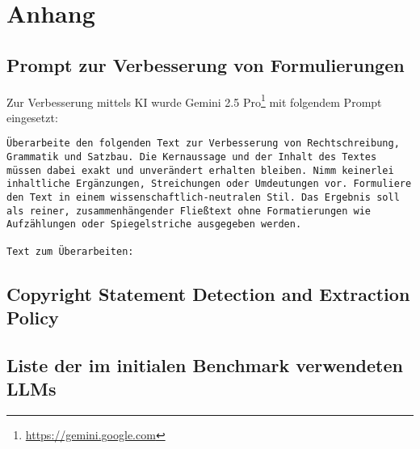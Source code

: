 \chapter{Anhang}\label{ch:anhang}

\section{Prompt zur Verbesserung von Formulierungen}\label{sec:prompt-zur-verbesserung-von-formulierungen}

Zur Verbesserung mittels KI wurde Gemini 2.5 Pro\footnote{\url{https://gemini.google.com}} mit folgendem Prompt eingesetzt:

\begin{lstlisting}[keepspaces=true]
Überarbeite den folgenden Text zur Verbesserung von Rechtschreibung, Grammatik und Satzbau. Die Kernaussage und der Inhalt des Textes müssen dabei exakt und unverändert erhalten bleiben. Nimm keinerlei inhaltliche Ergänzungen, Streichungen oder Umdeutungen vor. Formuliere den Text in einem wissenschaftlich-neutralen Stil. Das Ergebnis soll als reiner, zusammenhängender Fließtext ohne Formatierungen wie Aufzählungen oder Spiegelstriche ausgegeben werden.

Text zum Überarbeiten:
\end{lstlisting}

\section{Copyright Statement Detection and Extraction Policy}\label{sec:anhang-copyright-statement-detection-and-extraction-policy}



\section{Liste der im initialen Benchmark verwendeten LLMs}\label{sec:ahang-initial-benchmark-llm-liste}

